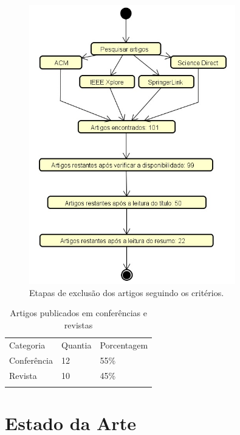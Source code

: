 \documentclass[smallextended]{svjour3}
\begin{document}
\begin{figure}[!ht]
	\centering
	\includegraphics[width=0.8\textwidth]{imagens/diagramaexclusaoartigos.jpg}
	\caption{Etapas de exclusão dos artigos seguindo os critérios.}
	\label{fig:diagramaexlusaoartigos}
\end{figure}

\begin{table}
	\caption{Artigos publicados em conferências e revistas}
	\label{tab:conferenciasrevistas}       %
	\begin{tabular}[!Ht]{lll}
		\hline\noalign{\smallskip}
		Categoria & Quantia & Porcentagem  \\
		\noalign{\smallskip}\hline\noalign{\smallskip}
		Conferência & 12 & 55\% \\
		Revista & 10 & 45\% \\
		\noalign{\smallskip}\hline
	\end{tabular}
\end{table}

\section{Estado da Arte}
\label{sec:4}
\end{document}
